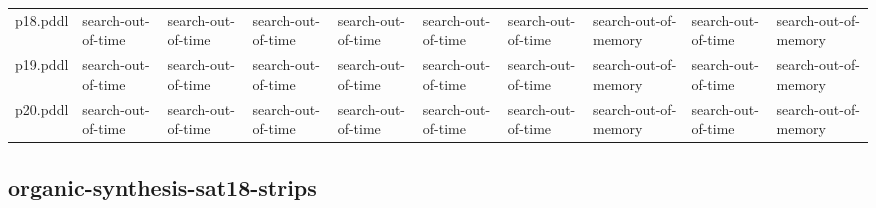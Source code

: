 \documentclass{article}
\begin{document}
\begin{tabular}{@{}lrrrrrrrrr@{}}
p18.pddl & \multicolumn{1}{|l|}{search-out-of-time} & \multicolumn{1}{|l|}{search-out-of-time} & \multicolumn{1}{|l|}{search-out-of-time} & \multicolumn{1}{|l|}{search-out-of-time} & \multicolumn{1}{|l|}{search-out-of-time} & \multicolumn{1}{|l|}{search-out-of-time} & \multicolumn{1}{|l|}{search-out-of-memory} & \multicolumn{1}{|l|}{search-out-of-time} & \multicolumn{1}{|l|}{search-out-of-memory} \\
p19.pddl & \multicolumn{1}{|l|}{search-out-of-time} & \multicolumn{1}{|l|}{search-out-of-time} & \multicolumn{1}{|l|}{search-out-of-time} & \multicolumn{1}{|l|}{search-out-of-time} & \multicolumn{1}{|l|}{search-out-of-time} & \multicolumn{1}{|l|}{search-out-of-time} & \multicolumn{1}{|l|}{search-out-of-memory} & \multicolumn{1}{|l|}{search-out-of-time} & \multicolumn{1}{|l|}{search-out-of-memory} \\
p20.pddl & \multicolumn{1}{|l|}{search-out-of-time} & \multicolumn{1}{|l|}{search-out-of-time} & \multicolumn{1}{|l|}{search-out-of-time} & \multicolumn{1}{|l|}{search-out-of-time} & \multicolumn{1}{|l|}{search-out-of-time} & \multicolumn{1}{|l|}{search-out-of-time} & \multicolumn{1}{|l|}{search-out-of-memory} & \multicolumn{1}{|l|}{search-out-of-time} & \multicolumn{1}{|l|}{search-out-of-memory} \\
\end{tabular}

\hypertarget{error-organic-synthesis-sat18-strips}{}
\subsection*{organic-synthesis-sat18-strips}
\end{document}
